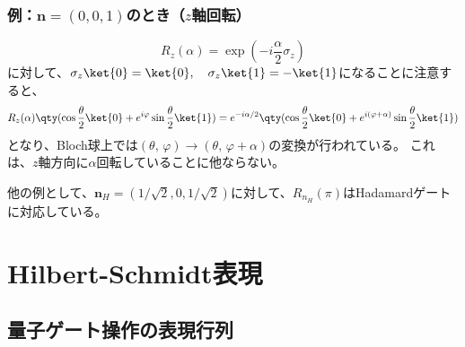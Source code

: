\documentclass[a4paper,11pt,uplatex]{jsarticle}%
\begin{document}
\subsubsection*{例：$\bm{n}=(0,0,1)$のとき（$z$軸回転）}
\begin{equation}
  R_z(\alpha)=\exp(-i\frac{\alpha}{2}\sigma_z)
\end{equation}
に対して、$\sigma_z\ket{0}=\ket{0},\quad\sigma_z\ket{1}=-\ket{1}$になることに注意すると、
\begin{equation}
  R_z(\alpha)\qty(\cos\frac{\theta}{2}\ket{0} + e^{i\varphi}\sin\frac{\theta}{2}\ket{1}) 
  = e^{-i\alpha/2}\qty(\cos\frac{\theta}{2}\ket{0} + e^{i(\varphi+\alpha)}\sin\frac{\theta}{2}\ket{1}) 
\end{equation}
となり、Bloch球上では$(\theta,\,\varphi)\rightarrow(\theta,\,\varphi+\alpha)$の変換が行われている。
これは、$z$軸方向に$\alpha$回転していることに他ならない。

他の例として、$\bm{n}_{H}=(1/\sqrt{2},0,1/\sqrt{2})$に対して、$R_{n_H}(\pi)$はHadamardゲートに対応している。

\section{Hilbert-Schmidt表現}

\subsection{量子ゲート操作の表現行列}
\end{document}
